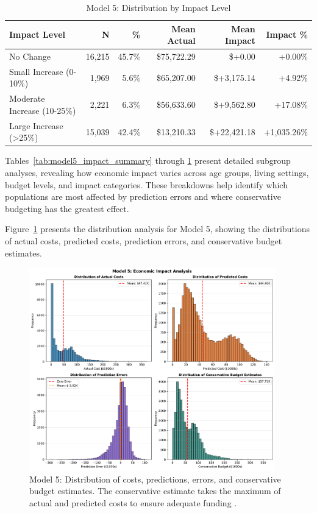 \begin{table}[htbp]
\centering
\small
\caption{Model 5: Distribution by Impact Level \FiscalYear}
\label{tab:model5_impact_distribution}
\begin{tabular}{lrrrrr}
\toprule
\textbf{Impact Level} & \textbf{N} & \textbf{\%} & \textbf{Mean Actual} & \textbf{Mean Impact} & \textbf{Impact \%} \\
\midrule
No Change & 16,215 & 45.7\% & \$75,722.29 & \$+0.00 & +0.00\% \\
Small Increase (0-10\%) & 1,969 & 5.6\% & \$65,207.00 & \$+3,175.14 & +4.92\% \\
Moderate Increase (10-25\%) & 2,221 & 6.3\% & \$56,633.60 & \$+9,562.80 & +17.08\% \\
Large Increase (>25\%) & 15,039 & 42.4\% & \$13,210.33 & \$+22,421.18 & +1,035.26\% \\
\bottomrule
\end{tabular}
\end{table}

Tables~\ref{tab:model5_impact_summary} through \ref{tab:model5_impact_distribution} present detailed subgroup analyses, revealing how economic impact varies across age groups, living settings, budget levels, and impact categories. These breakdowns help identify which populations are most affected by prediction errors and where conservative budgeting has the greatest effect.

Figure~\ref{fig:model5_impact_histograms} presents the distribution analysis for Model 5, showing the distributions of actual costs, predicted costs, prediction errors, and conservative budget estimates.

\begin{figure}[htbp]
\centering
\includegraphics[width=0.95\textwidth]{figures/model_5_Impact_Histograms.pdf}
\caption{Model 5: Distribution of costs, predictions, errors, and conservative budget estimates. The conservative estimate takes the maximum of actual and predicted costs to ensure adequate funding \FiscalYear.}
\label{fig:model5_impact_histograms}
\end{figure}

